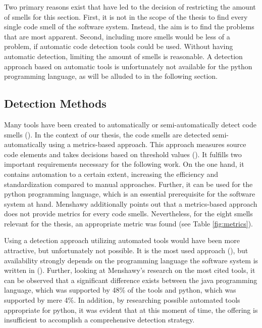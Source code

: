 Two primary reasons exist that have led to the decision of restricting the amount of smells for this section. First, it is not in the scope of the thesis to find every single code smell of the software system. Instead, the aim is to find the problems that are most apparent. Second, including more smells would be less of a problem, if automatic code detection tools could be used. Without having automatic detection, limiting the amount of smells is reasonable. A detection approach based on automatic tools is unfortunately not available for the python programming language, as will be alluded to in the following section.

\subsection{Detection Methods}
Many tools have been created to automatically or semi-automatically detect code smells (\cite{menshawy2021}). In the context of our thesis, the code smells are detected semi-automatically using a metrics-based approach. This approach measures source code elements and takes decisions based on threshold values (\cite{menshawy2021}). It fulfills two important requirements necessary for the following work. On the one hand, it contains automation to a certain extent, increasing the efficiency and standardization compared to manual approaches. Further, it can be used for the python programming language, which is an essential prerequisite for the software system at hand. Menshawy additionally points out that a metrics-based approach does not provide metrics for every code smells. Nevertheless, for the eight smells relevant for the thesis, an appropriate metric was found (see Table \ref{fig:metrics}). 

Using a detection approach utilizing automated tools would have been more attractive, but unfortunately not possible.  It is the most used approach (\cite{menshawy2021}), but availability strongly depends on the programming language the software system is written in (\cite{menshawy2021}). Further, looking at Menshawy's research on the most cited tools, it can be observed that a significant difference exists between the java programming language, which was supported  by 48\% of the tools and python, which was supported by mere 4\%. In addition, by researching possible automated tools appropriate for python, it was evident that at this moment of time, the offering is insufficient to accomplish a comprehensive detection strategy. 

